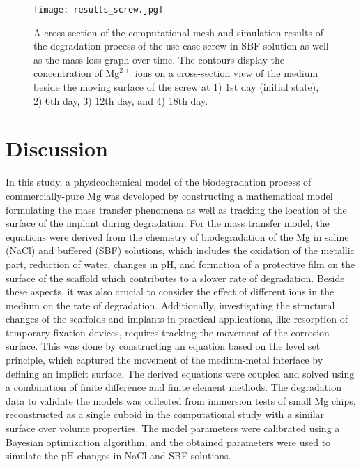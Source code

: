 \begin{figure}[t]
\centering
\medskip
\texttt{[image: results\_screw.jpg]}
\caption[Simulation results of the sample screw in the biodegradation test]{A cross-section of the computational mesh and simulation results of the degradation process of the use-case screw in {SBF} solution as well as the mass loss graph over time. The contours display the concentration of $\mathrm{Mg}^{2+}$ ions on a cross-section view of the medium beside the moving surface of the screw at 1) 1st day (initial state), 2) 6th day, 3) 12th day, and 4) 18th day.} \label{fig:results_screw}
\end{figure}


\section{Discussion}

In this study, a physicochemical model of the biodegradation process of commercially-pure Mg was developed by constructing a mathematical model formulating the mass transfer phenomena as well as tracking the location of the surface of the implant during degradation. For the mass transfer model, the equations were derived from the chemistry of biodegradation of the Mg in saline (NaCl) and buffered ({SBF}) solutions, which includes the oxidation of the metallic part, reduction of water, changes in pH, and formation of a protective film on the surface of the scaffold which contributes to a slower rate of degradation. Beside these aspects, it was also crucial to consider the effect of different ions in the medium on the rate of degradation. Additionally, investigating the structural changes of the scaffolds and implants in practical applications, like resorption of temporary fixation devices, requires tracking the movement of the corrosion surface. This was done by constructing an equation based on the level set principle, which captured the movement of the medium-metal interface by defining an implicit surface. The derived equations were coupled and solved using a combination of finite difference and finite element methods. The degradation data to validate the models was collected from immersion tests of small Mg chips, reconstructed as a single cuboid in the computational study with a similar surface over volume properties. The model parameters were calibrated using a Bayesian optimization algorithm, and the obtained parameters were used to simulate the pH changes in NaCl and {SBF} solutions.

